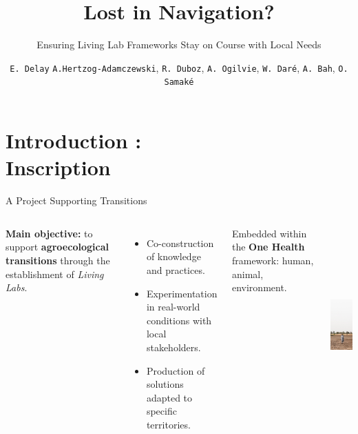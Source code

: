 \documentclass[newPxFont]{beamer}
\title{Lost in Navigation?}
\subtitle{Ensuring Living Lab Frameworks Stay on Course with Local Needs}
\author{\texttt{E. Delay} \texttt{A.Hertzog-Adamczewski}, \texttt{R. Duboz}, \texttt{A. Ogilvie}, \texttt{W. Daré}, \texttt{A. Bah}, \texttt{O. Samaké}}
\institute{CIRAD -- IRD -- UCAD -- SAED}
\begin{document}
%
%


\maketitle



\section{Introduction :\\ Inscription}

\begin{frame}[c]{A Project Supporting Transitions}
  \vspace{-0.5cm}
  \begin{columns}[onlytextwidth,T]
    \column{\dimexpr\linewidth-30mm-5mm}

    \textbf{Main objective:} to support \textbf{agroecological transitions} through the establishment of \textit{Living Labs}.

    \begin{itemize}
      \item Co-construction of knowledge and practices.
      \item Experimentation in real-world conditions with local stakeholders.
      \item Production of solutions adapted to specific territories.
    \end{itemize}

    \vspace{0.3cm}
    Embedded within the \textbf{One Health} framework: human, animal, environment.

    \column{30mm}
    \includegraphics[height=7.5cm]{img/diohine.jpg}
  \end{columns}
\end{frame}
\end{document}
